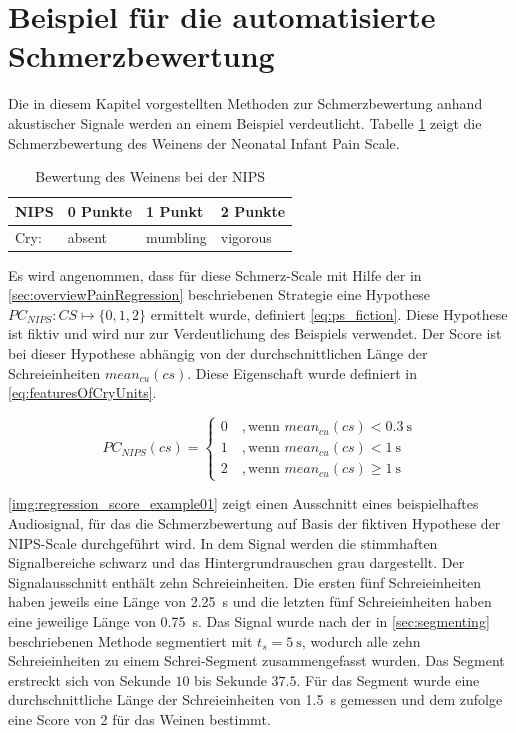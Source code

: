 \vspace{5mm}

\section{Beispiel für die automatisierte Schmerzbewertung}

Die in diesem Kapitel vorgestellten Methoden zur Schmerzbewertung anhand akustischer Signale werden an einem Beispiel verdeutlicht. Tabelle \ref{tab:fiction_scale} zeigt die Schmerzbewertung des Weinens der \glqq Neonatal Infant Pain Scale\grqq{}.

\begin{table}[h]
\footnotesize
\centering
\caption[Bewertung des Weinens bei der NIPS]{Bewertung des Weinens bei der NIPS \cite{nips}}
\label{tab:fiction_scale}
\begin{tabular}{@{}llll@{}}
\toprule
NIPS              & 0 Punkte    & 1 Punkt         & 2 Punkte       \\ \midrule
Cry: & absent & mumbling & vigorous \\ \bottomrule
\end{tabular}
\end{table}

Es wird angenommen, dass für diese Schmerz-Scale mit Hilfe der in \autoref{sec:overviewPainRegression} beschriebenen Strategie eine Hypothese $PC_{NIPS}: CS \mapsto \{0,1,2\}$ ermittelt wurde, definiert \autoref{eq:ps_fiction}. Diese Hypothese ist fiktiv und wird nur zur Verdeutlichung des Beispiels verwendet. Der Score ist bei dieser Hypothese abhängig von der durchschnittlichen Länge der Schreieinheiten $mean_{cu}(cs)$. Diese Eigenschaft wurde definiert in \autoref{eq:featuresOfCryUnits}.

\begin{equation}
PC_{NIPS}(cs) = \begin{cases}
 0 \quad ,  \text{wenn } mean_{cu}(cs) < \SI{0.3}{\second} \\
 1 \quad ,  \text{wenn } mean_{cu}(cs) < \SI{1}{\second} \\
 2 \quad ,  \text{wenn } mean_{cu}(cs) \geq \SI{1}{\second}
 \end{cases}	
 \label{eq:ps_fiction}
\end{equation}

\autoref{img:regression_score_example01} zeigt einen Ausschnitt eines beispielhaftes Audiosignal, für das die Schmerzbewertung auf Basis der fiktiven Hypothese der NIPS-Scale durchgeführt wird. In dem Signal werden die stimmhaften Signalbereiche schwarz und das Hintergrundrauschen grau dargestellt. Der Signalausschnitt enthält zehn Schreieinheiten. Die ersten fünf Schreieinheiten haben jeweils eine Länge von \SI{2.25}{\second} und die letzten fünf Schreieinheiten haben eine jeweilige Länge von \SI{0.75}{\second}. Das Signal wurde nach der in \autoref{sec:segmenting} beschriebenen Methode segmentiert mit $t_s = \SI{5}{\second}$, wodurch alle zehn Schreieinheiten zu einem Schrei-Segment zusammengefasst wurden. Das Segment erstreckt sich von Sekunde $10$ bis Sekunde $37.5$. Für das Segment wurde eine durchschnittliche Länge der Schreieinheiten von \SI{1.5}{\second} gemessen und dem zufolge eine Score von 2 für das Weinen bestimmt.

